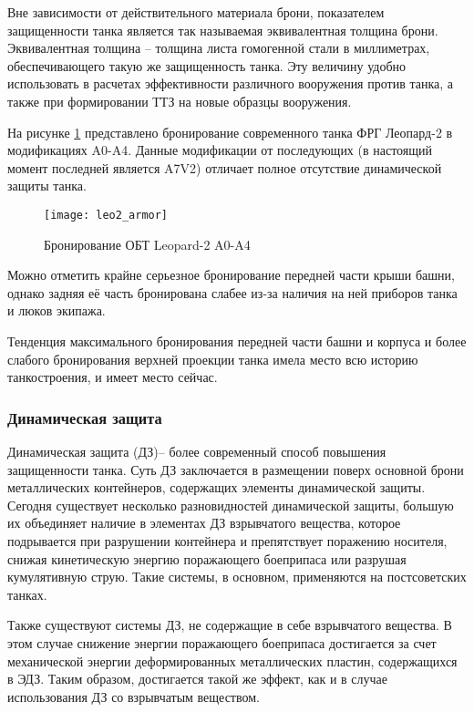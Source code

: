 Вне зависимости от действительного материала брони, показателем защищенности танка является так называемая эквивалентная толщина брони. Эквивалентная толщина – толщина листа гомогенной стали в миллиметрах, обеспечивающего такую же защищенность танка. Эту величину удобно использовать в расчетах эффективности различного вооружения против танка, а также при формировании ТТЗ на новые образцы вооружения.

На рисунке \ref{fig:leo2_armor} представлено бронирование современного танка ФРГ Леопард-2 в модификациях A0-A4. Данные модификации от последующих (в настоящий момент последней является A7V2) отличает полное отсутствие динамической защиты танка.

\begin{figure}[h]
	\texttt{[image: leo2\_armor]}
	\caption{Бронирование ОБТ Leopard-2 A0-A4}
	\label{fig:leo2_armor}
\end{figure}

Можно отметить крайне серьезное бронирование передней части крыши башни, однако задняя её часть бронирована слабее из-за наличия на ней приборов танка и люков экипажа.

Тенденция максимального бронирования передней части башни и корпуса и более слабого бронирования верхней проекции танка имела место всю историю танкостроения, и имеет место сейчас.

\subsubsection{Динамическая защита}
Динамическая защита (ДЗ)– более современный способ повышения защищенности танка. Суть ДЗ заключается в размещении поверх основной брони металлических контейнеров, содержащих элементы динамической защиты. Сегодня существует несколько разновидностей динамической защиты, большую их объединяет наличие в элементах ДЗ взрывчатого вещества, которое подрывается при разрушении контейнера и препятствует поражению носителя, снижая кинетическую энергию поражающего боеприпаса или разрушая кумулятивную струю. Такие системы, в основном, применяются на постсоветских танках.

Также существуют системы ДЗ, не содержащие в себе взрывчатого вещества. В этом случае снижение энергии поражающего боеприпаса достигается за счет механической энергии деформированных металлических пластин, содержащихся в ЭДЗ. Таким образом, достигается такой же эффект, как и в случае использования ДЗ со взрывчатым веществом.

